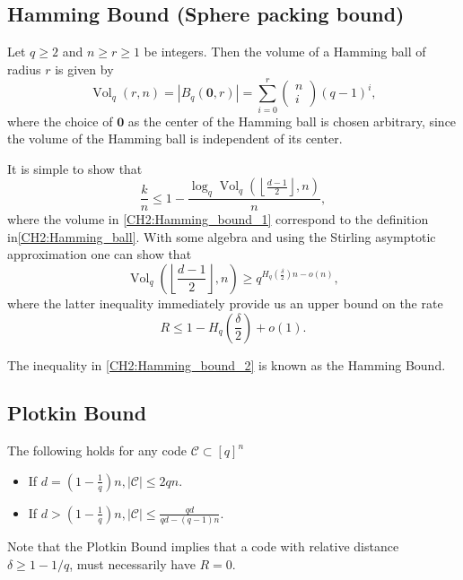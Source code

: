\subsection{Hamming Bound (Sphere packing bound)}
\begin{definition}
\indent Let $ q\geq2$ and $n \geq r \geq 1$ be integers. Then the volume of a Hamming ball of radius $r$ is given by
\begin{equation}
\operatorname{Vol}_{q}(r, n)=\left|B_{q}(\mathbf{0}, r)\right|=\sum_{i=0}^{r}\left(\begin{array}{l}
n \\
i
\end{array}\right)(q-1)^{i},
\label{CH2:Hamming_ball}
\end{equation}
where the choice of $\mathbf{0}$ as the center of the Hamming ball is chosen arbitrary, since the volume of the Hamming ball is independent of its center.
\end{definition}
\indent It is simple to show that
\begin{equation}
\frac{k}{n} \leq 1-\frac{\log _{q} \operatorname{Vol}_{q}\left(\left\lfloor\frac{d-1}{2}\right\rfloor, n\right)}{n},
\label{CH2:Hamming_bound_1}
\end{equation}
where the volume in \eqref{CH2:Hamming_bound_1} correspond to the definition in\eqref{CH2:Hamming_ball}. With some algebra and using the Stirling asymptotic approximation one can show that
\begin{equation}
\operatorname{Vol}_{q}\left(\left\lfloor\frac{d-1}{2}\right\rfloor, n\right) \geq q^{H_{q}\left(\frac{\delta}{2}\right) n-o(n)},
\end{equation}
where the latter inequality immediately provide us an upper bound on the rate
\begin{equation}
R \leq 1-H_{q}\left(\frac{\delta}{2}\right)+o(1).
\label{CH2:Hamming_bound_2}
\end{equation}

\indent The inequality in \eqref{CH2:Hamming_bound_2} is known as the Hamming Bound.

\subsection{Plotkin Bound}
\begin{definition}
The following holds for any code $\mathcal{C}\subset [q]^n$ 
\begin{itemize}
\item If $d=\left(1-\frac{1}{q}\right) n,|\mathcal{C}| \leq 2 q n$.
\item If $d>\left(1-\frac{1}{q}\right) n,|\mathcal{C}| \leq \frac{q d}{q d-(q-1) n}$.
\end{itemize}
Note that the Plotkin Bound implies that a code with relative distance $\delta\geq 1-1/q$, must necessarily have $R=0$.
\end{definition}

